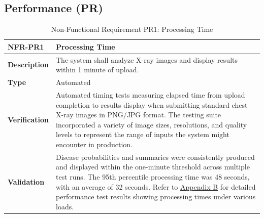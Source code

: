 \documentclass[12pt, titlepage]{article}
\begin{document}
\subsection{Performance (PR)}
\begin{table}[H]
\centering
{}
\begin{tabular}{|p{3.5cm}|p{11.5cm}|}
\hline
\rowcolor{gray!30}
\textbf{NFR-PR1} & \textbf{Processing Time} \\
\hline
\textbf{Description} & The system shall analyze X-ray images and display results within 1 minute of upload. \\
\hline
\textbf{Type} & Automated \\
\hline
\textbf{Verification} & Automated timing tests measuring elapsed time from upload completion to results display when submitting standard chest X-ray images in PNG/JPG format. The testing suite incorporated a variety of image sizes, resolutions, and quality levels to represent the range of inputs the system might encounter in production. \\
\hline
\textbf{Validation} & Disease probabilities and summaries were consistently produced and displayed within the one-minute threshold across multiple test runs. The 95th percentile processing time was 48 seconds, with an average of 32 seconds. Refer to \hyperref[appendix:B]{Appendix B} for detailed performance test results showing processing times under various loads. \\
\hline
\end{tabular}
\caption{Non-Functional Requirement PR1: Processing Time}
\end{table}
\end{document}
